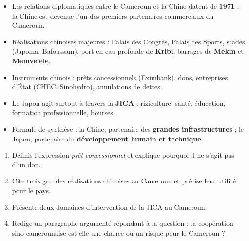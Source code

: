 \documentclass[11pt]{article}
\begin{document}
\begin{aretenir}
\begin{itemize}
\item Les relations diplomatiques entre le Cameroun et la Chine datent de \textbf{1971} ; la Chine est devenue l'un des premiers partenaires commerciaux du Cameroun.
\item Réalisations chinoises majeures : Palais des Congrès, Palais des Sports, stades (Japoma, Bafoussam), port en eau profonde de \textbf{Kribi}, barrages de \textbf{Mekin} et \textbf{Memve'ele}.
\item Instruments chinois : prêts concessionnels (Eximbank), dons, entreprises d'État (CHEC, Sinohydro), annulations de dettes.
\item Le Japon agit surtout à travers la \textbf{JICA} : riziculture, santé, éducation, formation professionnelle, bourses.
\item Formule de synthèse : la Chine, partenaire des \textbf{grandes infrastructures} ; le Japon, partenaire du \textbf{développement humain et technique}.
\end{itemize}
\end{aretenir}

\begin{exercice}
\begin{enumerate}
\item Définis l'expression \emph{prêt concessionnel} et explique pourquoi il ne s'agit pas d'un don.
\item Cite trois grandes réalisations chinoises au Cameroun et précise leur utilité pour le pays.
\item Présente deux domaines d'intervention de la JICA au Cameroun.
\item Rédige un paragraphe argumenté répondant à la question : la coopération sino-camerounaise est-elle une chance ou un risque pour le Cameroun ?
\end{enumerate}
\end{exercice}
\end{document}
